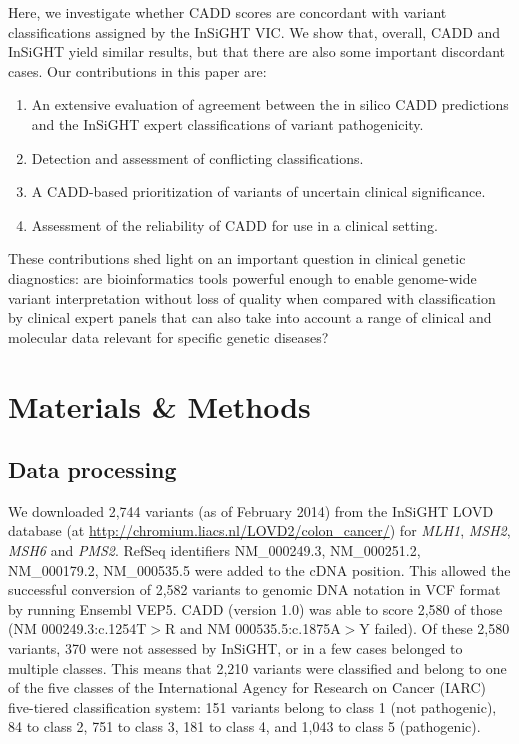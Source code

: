 Here, we investigate whether CADD scores are concordant with variant classifications assigned by the InSiGHT VIC. We show that, overall, CADD and InSiGHT yield similar results, but that there are also some important discordant cases. Our contributions in this paper are:
\begin{enumerate}
\item An extensive evaluation of agreement between the in silico CADD predictions and the InSiGHT expert classifications of variant pa\-tho\-ge\-ni\-ci\-ty.
\item Detection and assessment of conflicting classifications.
\item A CADD-based prioritization of variants of uncertain clinical
significance.
\item Assessment of the reliability of CADD for use in a clinical
setting.
\end{enumerate}
These contributions shed light on an important question in clinical genetic diagnostics: are bioinformatics tools powerful enough to enable genome-wide variant interpretation without loss of quality when compared with classification by clinical expert panels that can also take into account a range of clinical and molecular data relevant for specific genetic diseases?





\section{Materials \& Methods}
\label{methods}
\subsection{Data processing}
We downloaded 2,744 variants (as of February 2014) from the InSiGHT LOVD database (at \url{http://chromium.liacs.nl/LOVD2/colon_cancer/}) for \textit{MLH1}, \textit{MSH2}, \textit{MSH6} and \textit{PMS2}.
RefSeq identifiers NM\_000249.3, NM\_000251.2, NM\_000179.2, NM\_000535.5 were added to the cDNA position.
This allowed the successful conversion of 2,582 variants to genomic DNA notation in VCF format by running Ensembl VEP5\cite{McLaren_2010}.
CADD (version 1.0) was able to score 2,580 of those (NM 000249.3:c.1254T$>$R and NM 000535.5:c.1875A$>$Y failed). Of these 2,580 variants, 370 were not assessed by InSiGHT, or in a few cases belonged to multiple classes. This means that 2,210 variants were classified and belong to one of the five classes of the International Agency for Research on Cancer (IARC) five-tiered classification system: 151 variants belong to class 1 (not pathogenic), 84 to class 2, 751 to class 3, 181 to class 4, and 1,043 to class 5 (pathogenic).

